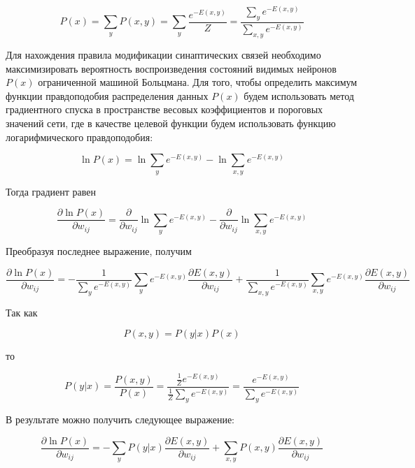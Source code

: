 \begin{equation*}
	P(x)=\sum_y P(x,y)=\sum_y \frac{e^{-E(x,y)}}{Z}=\frac{\sum_y e^{-E(x,y)}}{\sum_{x,y} e^{-E(x,y)}}
\end{equation*}

Для нахождения правила модификации синаптических связей необходимо максимизировать вероятность воспроизведения состояний видимых нейронов $P(x)$ ограниченной машиной Больцмана. Для того, чтобы определить максимум функции правдоподобия распределения данных $P(x)$ будем использовать метод градиентного спуска в пространстве весовых коэффициентов и пороговых значений сети, где в качестве целевой функции будем использовать функцию логарифмического правдоподобия:

\begin{equation*}
	\ln P(x)=\ln \sum_y e^{-E(x,y)}-\ln \sum_{x,y} e^{-E(x,y)}
\end{equation*}

Тогда градиент равен

\begin{equation*}
	\frac{\partial \ln P(x)}{\partial w_{ij}}=\frac{\partial}{\partial w_{ij}}\ln \sum_y e^{-E(x,y)}-\frac{\partial}{\partial w_{ij}}\ln\sum_{x,y} e^{-E(x,y)}
\end{equation*}

Преобразуя последнее выражение, получим

\begin{equation*}
	\frac{\partial \ln P(x)}{\partial w_{ij}}=-\frac{1}{\sum_y e^{-E(x,y)}}\sum_y e^{-E(x,y)}\frac{\partial E(x,y)}{\partial w_{ij}}+\frac{1}{\sum_{x,y} e^{-E(x,y)}}\sum_{x,y} e^{-E(x,y)}\frac{\partial E(x,y)}{\partial w_{ij}}
\end{equation*}

Так как

\begin{equation*}
	P(x,y)=P(y \lvert x)P(x)
\end{equation*}

то

\begin{equation*}
	P(y \lvert x) = \frac{P(x,y)}{P(x)}=\frac{\frac{1}{Z}e^{-E(x,y)}}{\frac{1}{Z}\sum_y e^{-E(x,y)}}=\frac{e^{-E(x,y)}}{\sum_y e^{-E(x,y)}}
\end{equation*}

В результате можно получить следующее выражение:

\begin{equation}
	\label{derivative_log}
	\frac{\partial \ln P(x)}{\partial w_{ij}}=-\sum_y P(y \lvert x)\frac{\partial E(x,y)}{\partial w_{ij}} + \sum_{x,y} P(x,y)\frac{\partial E(x,y)}{\partial w_{ij}}
\end{equation}

